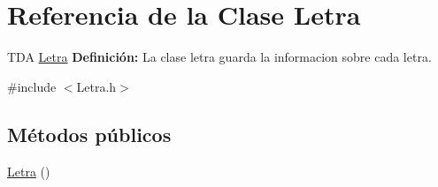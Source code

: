 \hypertarget{class_letra}{}\section{Referencia de la Clase Letra}
\label{class_letra}


T\+DA \hyperlink{class_letra}{Letra} {\bfseries Definición\+:} La clase letra guarda la informacion sobre cada letra.  




{\ttfamily \#include $<$Letra.\+h$>$}

\subsection*{Métodos públicos}
\begin{DoxyCompactItemize}
\item 
\hyperlink{class_letra_a2e236c67e3630258c6d3d9f2a9e66709}{Letra} ()\hypertarget{class_letra_a2e236c67e3630258c6d3d9f2a9e66709}{}\label{class_letra_a2e236c67e3630258c6d3d9f2a9e66709}


\end{DoxyCompactItemize}
